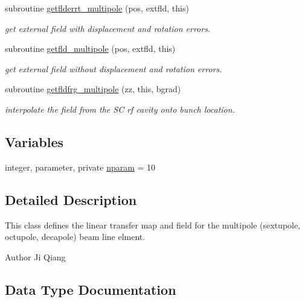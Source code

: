 \begin{DoxyCompactItemize}
subroutine \mbox{\hyperlink{namespacemultipoleclass_ab9a8281befade6912e33564f4db52877}{getflderrt\+\_\+multipole}} (pos, extfld, this)
\begin{DoxyCompactList}\small\item\em get external field with displacement and rotation errors. \end{DoxyCompactList}\item 
subroutine \mbox{\hyperlink{namespacemultipoleclass_af4fb9d3cfd9db2d92930fcda605fbe26}{getfld\+\_\+multipole}} (pos, extfld, this)
\begin{DoxyCompactList}\small\item\em get external field without displacement and rotation errors. \end{DoxyCompactList}\item 
subroutine \mbox{\hyperlink{namespacemultipoleclass_a8712b7622d8ed7c0e71cdc18204dcf46}{getfldfrg\+\_\+multipole}} (zz, this, bgrad)
\begin{DoxyCompactList}\small\item\em interpolate the field from the SC rf cavity onto bunch location. \end{DoxyCompactList}\end{DoxyCompactItemize}
\subsection*{Variables}
\begin{DoxyCompactItemize}
\item 
integer, parameter, private \mbox{\hyperlink{namespacemultipoleclass_a67bb1a71461cf39cdd365adab7fec8b9}{nparam}} = 10
\end{DoxyCompactItemize}


\subsection{Detailed Description}
This class defines the linear transfer map and field for the multipole (sextupole, octupole, decapole) beam line elment. 

\begin{DoxyAuthor}{Author}
Ji Qiang 
\end{DoxyAuthor}


\subsection{Data Type Documentation}
\label{structmultipoleclass_1_1multipole}
